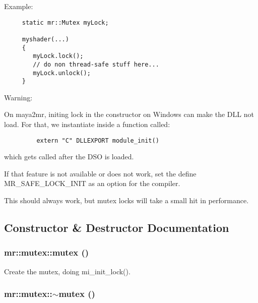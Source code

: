 Example:



\footnotesize\begin{verbatim}     static mr::Mutex myLock;
   
     myshader(...)
     {
        myLock.lock();
        // do non thread-safe stuff here...
        myLock.unlock();
     }
\end{verbatim}
\normalsize


\begin{Desc}
\item[Warning:]\end{Desc}
On maya2mr, initing lock in the constructor on Windows can make the DLL not load. For that, we instantiate inside a function called:



\footnotesize\begin{verbatim}         extern "C" DLLEXPORT module_init()
\end{verbatim}
\normalsize


which gets called after the DSO is loaded.

If that feature is not available or does not work, set the define MR\_\-SAFE\_\-LOCK\_\-INIT as an option for the compiler.

This should always work, but mutex locks will take a small hit in performance. 



\subsection{Constructor \& Destructor Documentation}
\subsubsection{\setlength{\rightskip}{0pt plus 5cm}mr::mutex::mutex ()\hspace{0.3cm}{\tt  [inline]}}\label{structmr_1_1mutex_a0}


Create the mutex, doing mi\_\-init\_\-lock(). 

\subsubsection{\setlength{\rightskip}{0pt plus 5cm}mr::mutex::$\sim${\bf mutex} ()\hspace{0.3cm}{\tt  [inline]}}\label{structmr_1_1mutex_a1}


